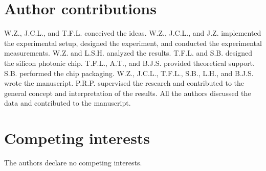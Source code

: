 \documentclass[pdflatex,mathphys]{sty}%
\begin{document}
\section{Author contributions}
W.Z., J.C.L., and T.F.L. conceived the ideas. W.Z., J.C.L., and J.Z. implemented the experimental setup, designed the experiment, and conducted the experimental measurements. W.Z. and L.S.H. analyzed the results. T.F.L. and S.B. designed the silicon photonic chip. T.F.L., A.T., and B.J.S. provided theoretical support. S.B. performed the chip packaging. W.Z., J.C.L., T.F.L., S.B., L.H., and B.J.S. wrote the manuscript. P.R.P. supervised the research and contributed to the general concept and interpretation of the results. All the authors discussed the data and contributed to the manuscript.

\section{Competing interests}
The authors declare no competing interests.
\end{document}
